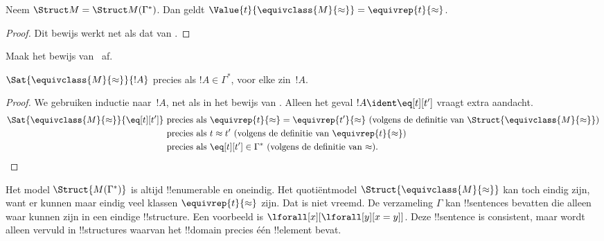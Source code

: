 \documentclass[../../../include/open-logic-section]{subfiles}
\begin{document}
\begin{lem} 
 Neem $\Struct M = \Struct M
 (\Gamma^*)$. Dan geldt $\Value{t}{\equivclass{M}{\approx}} = \equivrep{t}
 {\approx}$.
\end{lem}
\begin{proof} 
Dit bewijs werkt net als dat van .
\end{proof}

\begin{prob}
Maak het bewijs van~ af.
\end{prob}

\begin{lem}
$\Sat{\equivclass{M}{\approx}}{!A}$ precies als $!A \in \Gamma^*$, voor
elke zin~$!A$.
\end{lem}

\begin{proof}
We gebruiken inductie naar~$!A$, net als in het bewijs van
. Alleen het geval $!A \ident \eq[t][t']$ vraagt
extra aandacht.
\begin{align*}
\Sat{\equivclass{M}{\approx}}{\eq[t][t']} & \text{ precies als } \equivrep{t}{\approx} = \equivrep{t'}{\approx}
\text{ (volgens de definitie van $\Struct{\equivclass{M}{\approx}}$)}\\
& \text{ precies als } t \approx t' \text{ (volgens de definitie van $\equivrep{t}{\approx}$)}\\
& \text{ precies als } \eq[t][t'] \in \Gamma^* \text{ (volgens de definitie van $\approx$).}
\end{align*}
\end{proof}

\begin{digress}
Het model $\Struct{M(\Gamma^*)}$ is altijd !!{enumerable} en oneindig.
Het quotiëntmodel $\Struct{\equivclass{M}{\approx}}$ kan toch eindig zijn,
want er kunnen maar eindig veel klassen $\equivrep{t}{\approx}$ zijn.
Dat is niet vreemd. De verzameling $\Gamma$ kan !!{sentence}s bevatten
die alleen waar kunnen zijn in een eindige !!{structure}. Een voorbeeld
is $\lforall[x][\lforall[y][x = y]]$. Deze !!{sentence} is consistent,
maar wordt alleen vervuld in !!{structure}s waarvan het !!{domain}
precies één !!{element} bevat.
\end{digress}
\end{document}
